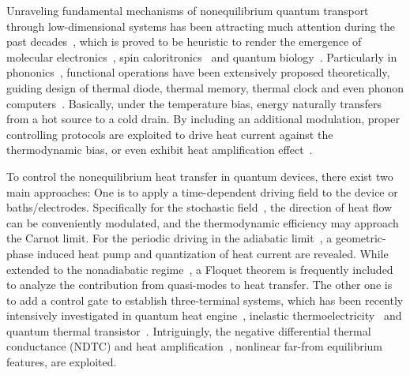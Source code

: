 \documentclass[twocolumn,preprintnumbers,amsmath,amssymb]{revtex4}
\begin{document}
Unraveling fundamental mechanisms of nonequilibrium quantum transport through low-dimensional systems has been attracting much attention during the past decades~\cite{sdatta2005,apjauho2007,ydubi2011rmp},
which is proved to be heuristic to render the emergence of molecular electronics~\cite{mratner2013nn,dvirasegal2016ann}, spin caloritronics~\cite{gewbauer2012nm} and quantum biology~\cite{kdorfman2013pnas,mmohseni2014}.
Particularly in phononics~\cite{nbli2012rmp,jren2015aip}, functional operations have been extensively  proposed theoretically, guiding design
of thermal diode, thermal memory, thermal clock and even phonon computers~\cite{bli2004prl,bli2006apl,cwchang2006science,lwang2007prl,lwang2008prl,jswang2008epjb,tchan2014am,jhjiang2015prb,xyshen2015prl}.
Basically, under the temperature bias, energy naturally transfers from a hot source to a cold drain.
By including an additional modulation, proper controlling protocols are exploited to drive heat current against the thermodynamic bias,
or even exhibit heat amplification effect~\cite{nbli2012rmp}.

To control the nonequilibrium heat transfer in quantum devices, there exist two main approaches:
One is to apply a time-dependent driving field to the device or baths/electrodes.
Specifically for the stochastic field~\cite{nasinitsyn2007prl,dsegal2008prl}, the direction of heat flow can be conveniently modulated, and the thermodynamic efficiency may approach the Carnot limit.
For the periodic driving in the adiabatic limit~\cite{jieren2010prl,tyuge2012prb,chentian2013prb,mfl2016prb}, a geometric-phase induced heat pump and quantization of heat current are revealed.
While extended to the nonadiabatic regime~\cite{mstrass2005prl,dsegal2006pre,mrey2007prb,klw2014ptep}, a Floquet theorem is frequently included to analyze the contribution from quasi-modes to heat transfer.
The other one is to add a control gate to establish three-terminal systems, which has been recently intensively investigated in quantum heat engine~\cite{akato2015jcp,dzxu2016njp,gbenenti2017pr}, inelastic thermoelectricity~\cite{jieren2012prb,jhjiang2016crp,jhjiang2017pra} and quantum thermal transistor~\cite{prl2014pbabdallah,kjoulain2016prl,rsanchez2017prb}.
Intriguingly, the negative differential thermal conductance (NDTC) and heat amplification~\cite{bli2006apl}, nonlinear far-from equilibrium features, are exploited.
\end{document}
